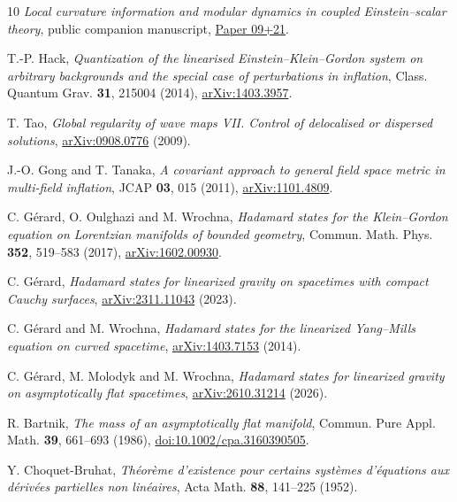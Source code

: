 \documentclass[11pt]{article}
\begin{document}
\begin{thebibliography}{10}
\emph{Local curvature information and modular dynamics in coupled Einstein--scalar theory},
public companion manuscript,
\href{https://github.com/g3173028019-beep/ai-automated-quantum-gravity-research/tree/main/papers/09-21-coupled-modular-kernel}{Paper 09+21}.

T.-P. Hack,
\emph{Quantization of the linearised Einstein--Klein--Gordon system on arbitrary backgrounds and the special case of perturbations in inflation},
Class. Quantum Grav. \textbf{31}, 215004 (2014),
\href{https://arxiv.org/abs/1403.3957}{arXiv:1403.3957}.

T. Tao,
\emph{Global regularity of wave maps VII. Control of delocalised or dispersed solutions},
\href{https://arxiv.org/abs/0908.0776}{arXiv:0908.0776} (2009).

J.-O. Gong and T. Tanaka,
\emph{A covariant approach to general field space metric in multi-field inflation},
JCAP \textbf{03}, 015 (2011),
\href{https://arxiv.org/abs/1101.4809}{arXiv:1101.4809}.

C. G\'erard, O. Oulghazi and M. Wrochna,
\emph{Hadamard states for the Klein--Gordon equation on Lorentzian manifolds of bounded geometry},
Commun. Math. Phys. \textbf{352}, 519--583 (2017),
\href{https://arxiv.org/abs/1602.00930}{arXiv:1602.00930}.

C. G\'erard,
\emph{Hadamard states for linearized gravity on spacetimes with compact Cauchy surfaces},
\href{https://arxiv.org/abs/2311.11043}{arXiv:2311.11043} (2023).

C. G\'erard and M. Wrochna,
\emph{Hadamard states for the linearized Yang--Mills equation on curved spacetime},
\href{https://arxiv.org/abs/1403.7153}{arXiv:1403.7153} (2014).

C. G\'erard, M. Molodyk and M. Wrochna,
\emph{Hadamard states for linearized gravity on asymptotically flat spacetimes},
\href{https://arxiv.org/abs/2610.31214}{arXiv:2610.31214} (2026).

R. Bartnik,
\emph{The mass of an asymptotically flat manifold},
Commun. Pure Appl. Math. \textbf{39}, 661--693 (1986),
\href{https://doi.org/10.1002/cpa.3160390505}{doi:10.1002/cpa.3160390505}.

Y. Choquet-Bruhat,
\emph{Th\'eor\`eme d'existence pour certains syst\`emes d'\'equations aux d\'eriv\'ees partielles non lin\'eaires},
Acta Math. \textbf{88}, 141--225 (1952).
\end{thebibliography}
\end{document}
